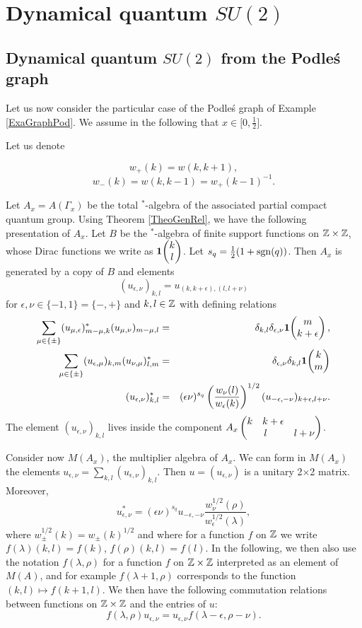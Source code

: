 
\section{Dynamical quantum $SU(2)$}

\subsection{Dynamical quantum $SU(2)$ from the Podle\'{s} graph}

Let us now consider the particular case of the Podle\'{s} graph of Example \ref{ExaGraphPod}. We assume in the following that $x\in \lbrack 0,\frac{1}{2}\rbrack$.

Let us denote

\[w_+(k) = w(k,k+1),\]\[w_-(k)  = w(k,k-1) = w_+(k-1)^{-1}.\] 

Let $A_x = A(\Gamma_x)$ be the total $^*$-algebra of the associated partial compact quantum group. Using Theorem \ref{TheoGenRel}, we have the following presentation of $A_x$. Let $B$ be the $^*$-algebra of finite support functions on $\mathbb{Z}\times \mathbb{Z}$, whose Dirac functions we write as $\mathbf{1}\!\begin{pmatrix} k \\ l\end{pmatrix}$. Let $s_q = \frac{1}{2}(1+\operatorname{\mathrm{sgn}}(q))$. Then $A_x$ is generated by a copy of $B$ and elements \[(u_{\epsilon,\nu})_{k,l} = u_{(k,k+\epsilon),(l,l+\nu)}\] for $\epsilon,\nu\in \{-1,1\}=\{-,+\}$ and $k,l\in \mathbb{Z}$ with defining relations \begin{eqnarray*} \sum_{\mu\in \{\pm\}} (u_{\mu,\epsilon})_{m-\mu,k}^* (u_{\mu,\nu})_{m-\mu,l}&=& \delta_{k,l} \delta_{\epsilon,\nu} \mathbf{1}\!\begin{pmatrix} m \\ k+\epsilon\end{pmatrix},\\ \sum_{\mu\in \{\pm\}} (u_{\epsilon,\mu})_{k,m} (u_{\nu,\mu})_{l,m}^* &=& \delta_{\epsilon,\nu}\delta_{k,l} \mathbf{1}\!\begin{pmatrix} k \\ m\end{pmatrix}\\ (u_{\epsilon,\nu})_{k,l}^* &=& (\epsilon\nu)^{s_q} \left(\frac{w_{\nu}(l)}{w_{\epsilon}(k)}\right)^{1/2} (u_{-\epsilon,-\nu})_{k+\epsilon,l+\nu}.\end{eqnarray*} The element $(u_{\epsilon,\nu})_{k,l}$ lives inside the component $A_x\begin{pmatrix}k \quad k+\epsilon\\l&l+\nu\end{pmatrix}$.

Consider now $M(A_x)$, the multiplier algebra of $A_x$. We can form in $M(A_x)$ the elements $u_{\epsilon,\nu} = \sum_{k,l} (u_{\epsilon,\nu})_{k,l}$. Then $u=(u_{\epsilon,\nu})$ is a unitary 2$\times$2 matrix. Moreover, \[u_{\epsilon,\nu}^* = (\epsilon\nu)^{s_q} u_{-\epsilon,-\nu}\frac{w_{\nu}^{1/2}(\rho)}{w_{\epsilon}^{1/2}(\lambda)} ,\] where $w_{\pm}^{1/2}(k) = w_{\pm}(k)^{1/2}$ and where for a function $f$ on $\mathbb{Z}$ we write $f(\lambda)(k,l) = f(k)$, $f(\rho)(k,l) = f(l)$. In the following, we then also use the notation $f(\lambda,\rho)$ for a function $f$ on $\mathbb{Z}\times \mathbb{Z}$ interpreted as an element of $M(A)$, and for example $f(\lambda+1,\rho)$ corresponds to the function $(k,l)\mapsto f(k+1,l)$. We then have the following commutation relations between functions on $\mathbb{Z}\times \mathbb{Z}$ and the entries of $u$: \[f(\lambda,\rho)u_{\epsilon,\nu} = u_{\epsilon,\nu}f(\lambda-\epsilon,\rho-\nu).\]

